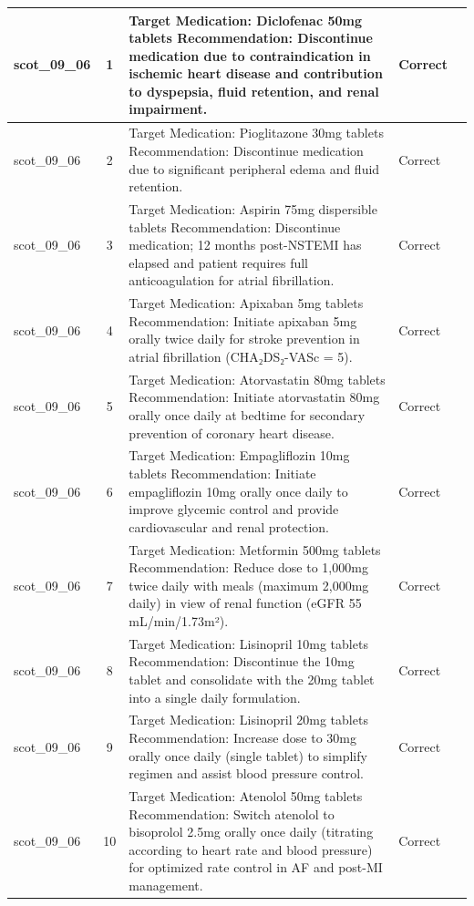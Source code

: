 \begin{longtable}{|p{1.45cm}|c|p{10.2cm}|p{1.55cm}|p{2.3cm}|}
\hline
scot\_09\_06 & 1 & Target Medication: Diclofenac 50mg tablets Recommendation: Discontinue medication due to contraindication in ischemic heart disease and contribution to dyspepsia, fluid retention, and renal impairment. & Correct &  \\
\hline
scot\_09\_06 & 2 & Target Medication: Pioglitazone 30mg tablets Recommendation: Discontinue medication due to significant peripheral edema and fluid retention. & Correct &  \\
\hline
scot\_09\_06 & 3 & Target Medication: Aspirin 75mg dispersible tablets Recommendation: Discontinue medication; 12 months post-NSTEMI has elapsed and patient requires full anticoagulation for atrial fibrillation. & Correct &  \\
\hline
scot\_09\_06 & 4 & Target Medication: Apixaban 5mg tablets Recommendation: Initiate apixaban 5mg orally twice daily for stroke prevention in atrial fibrillation (CHA₂DS₂-VASc = 5). & Correct &  \\
\hline
scot\_09\_06 & 5 & Target Medication: Atorvastatin 80mg tablets Recommendation: Initiate atorvastatin 80mg orally once daily at bedtime for secondary prevention of coronary heart disease. & Correct &  \\
\hline
scot\_09\_06 & 6 & Target Medication: Empagliflozin 10mg tablets Recommendation: Initiate empagliflozin 10mg orally once daily to improve glycemic control and provide cardiovascular and renal protection. & Correct &  \\
\hline
scot\_09\_06 & 7 & Target Medication: Metformin 500mg tablets Recommendation: Reduce dose to 1,000mg twice daily with meals (maximum 2,000mg daily) in view of renal function (eGFR 55 mL/min/1.73m²). & Correct &  \\
\hline
scot\_09\_06 & 8 & Target Medication: Lisinopril 10mg tablets Recommendation: Discontinue the 10mg tablet and consolidate with the 20mg tablet into a single daily formulation. & Correct &  \\
\hline
scot\_09\_06 & 9 & Target Medication: Lisinopril 20mg tablets Recommendation: Increase dose to 30mg orally once daily (single tablet) to simplify regimen and assist blood pressure control. & Correct &  \\
\hline
scot\_09\_06 & 10 & Target Medication: Atenolol 50mg tablets Recommendation: Switch atenolol to bisoprolol 2.5mg orally once daily (titrating according to heart rate and blood pressure) for optimized rate control in AF and post-MI management. & Correct &  \\

\end{longtable}

